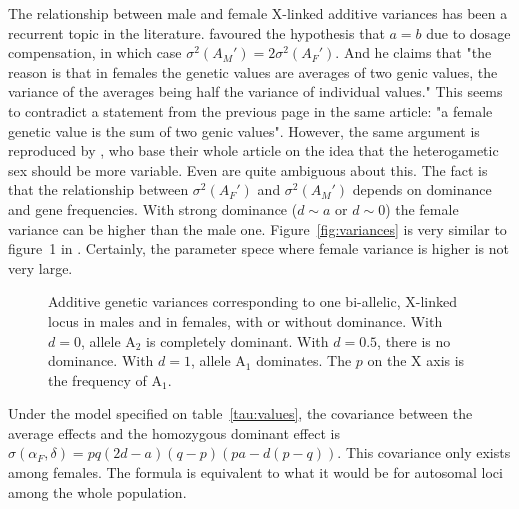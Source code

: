 \documentclass[a4paper,12pt]{article}
\begin{document}
The relationship between male and female X-linked additive variances has been a recurrent topic in the literature. \citet{James1973} favoured the hypothesis that $a=b$ due to dosage compensation, in which case $\sigma^2(A_M') = 2\sigma^2(A_F')$. And he claims that "the reason is that in females the genetic values are averages of two genic values, the variance of the averages being half the variance of individual values." This seems to contradict a statement from the previous page in the same article: "a female genetic value is the sum of two genic values". However, the same argument is reproduced by \citet{Reinhold2013}, who base their whole article on the idea that the heterogametic sex should be more variable. Even \citet[pp. 715f]{Lynch1998} are quite ambiguous about this. The fact is that the relationship between $\sigma^2(A_F')$ and $\sigma^2(A_M')$ depends on dominance and gene frequencies. With strong dominance ($d\sim a$ or $d\sim 0$) the female variance can be higher than the male one. Figure~\ref{fig:variances} is very similar to figure~1 in \citet{Reinhold2013}. Certainly, the parameter spece where female variance is higher is not very large. 

\begin{figure}
\caption{Additive genetic variances corresponding to one bi-allelic, X-linked locus in males and in females, with or without dominance. With $d=0$, allele A$_2$ is completely dominant. With $d=0.5$, there is no dominance. With $d=1$, allele A$_1$ dominates. The $p$ on the X axis is the frequency of A$_1$.}
\end{figure}

Under the model specified on table~\ref{tau:values}, the covariance between the average effects and the homozygous dominant effect is $\sigma(\alpha_F,\delta) = pq(2d-a)(q-p)(pa-d(p-q))$. This covariance only exists among females. The formula is equivalent to what it would be for autosomal loci among the whole population.



\end{document}
